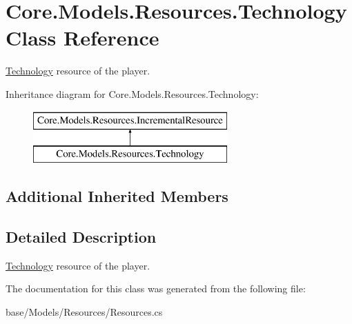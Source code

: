 \hypertarget{classCore_1_1Models_1_1Resources_1_1Technology}{}\section{Core.\+Models.\+Resources.\+Technology Class Reference}
\label{classCore_1_1Models_1_1Resources_1_1Technology}


\hyperlink{classCore_1_1Models_1_1Resources_1_1Technology}{Technology} resource of the player.  


Inheritance diagram for Core.\+Models.\+Resources.\+Technology\+:\begin{figure}[H]
\begin{center}
\leavevmode
\includegraphics[height=2.000000cm]{classCore_1_1Models_1_1Resources_1_1Technology}
\end{center}
\end{figure}
\subsection*{Additional Inherited Members}


\subsection{Detailed Description}
\hyperlink{classCore_1_1Models_1_1Resources_1_1Technology}{Technology} resource of the player. 



The documentation for this class was generated from the following file\+:\begin{DoxyCompactItemize}
\item 
base/\+Models/\+Resources/Resources.\+cs\end{DoxyCompactItemize}
